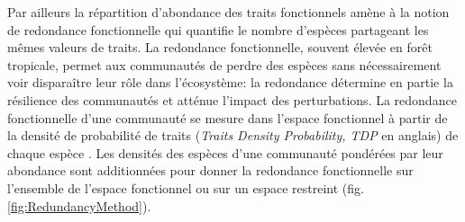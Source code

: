 \documentclass[
  11pt,
  french,
  A4paper,
  extrafontsizes,onecolumn,openright
  ]{memoir}
\begin{document}
Par ailleurs la répartition d'abondance des traits fonctionnels amène à
la notion de redondance fonctionnelle qui quantifie le nombre d'espèces
partageant les mêmes valeurs de traits. La redondance fonctionnelle,
souvent élevée en forêt tropicale, permet aux communautés de perdre des
espèces sans nécessairement voir disparaître leur rôle dans
l'écosystème: la redondance détermine en partie la résilience des
communautés et atténue l'impact des perturbations. La redondance
fonctionnelle d'une communauté se mesure dans l'espace fonctionnel à
partir de la densité de probabilité de traits (\emph{Traits Density
Probability, TDP} en anglais) de chaque espèce \autocite{Carmona2016}.
Les densités des espèces d'une communauté pondérées par leur abondance
sont additionnées pour donner la redondance fonctionnelle sur l'ensemble
de l'espace fonctionnel ou sur un espace restreint
(fig.\ref{fig:RedundancyMethod}).
\end{document}
